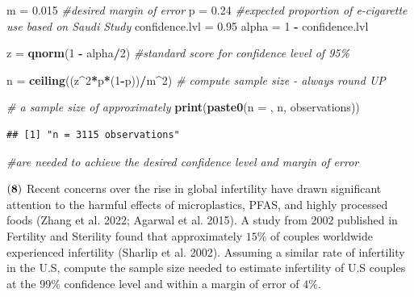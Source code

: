 \documentclass[
]{article}
\newenvironment{Shaded}{\begin{snugshade}}{\end{snugshade}}
\newcommand{\CommentTok}[1]{\textcolor[rgb]{0.56,0.35,0.01}{\textit{#1}}}
\newcommand{\DecValTok}[1]{\textcolor[rgb]{0.00,0.00,0.81}{#1}}
\newcommand{\FloatTok}[1]{\textcolor[rgb]{0.00,0.00,0.81}{#1}}
\newcommand{\FunctionTok}[1]{\textcolor[rgb]{0.13,0.29,0.53}{\textbf{#1}}}
\newcommand{\NormalTok}[1]{#1}
\newcommand{\OtherTok}[1]{\textcolor[rgb]{0.56,0.35,0.01}{#1}}
\newcommand{\SpecialCharTok}[1]{\textcolor[rgb]{0.81,0.36,0.00}{\textbf{#1}}}
\newcommand{\StringTok}[1]{\textcolor[rgb]{0.31,0.60,0.02}{#1}}
\begin{document}
\begin{Shaded}
\begin{Highlighting}[]
\NormalTok{m }\OtherTok{=} \FloatTok{0.015} \CommentTok{\#desired margin of error}
\NormalTok{p }\OtherTok{=} \FloatTok{0.24} \CommentTok{\#expected proportion of e{-}cigarette use based on Saudi Study}
\NormalTok{confidence.lvl }\OtherTok{=} \FloatTok{0.95}
\NormalTok{alpha }\OtherTok{=} \DecValTok{1} \SpecialCharTok{{-}}\NormalTok{ confidence.lvl}

\NormalTok{z }\OtherTok{=} \FunctionTok{qnorm}\NormalTok{(}\DecValTok{1} \SpecialCharTok{{-}}\NormalTok{ alpha}\SpecialCharTok{/}\DecValTok{2}\NormalTok{) }\CommentTok{\#standard score for confidence level of 95\%}

\NormalTok{n }\OtherTok{=} \FunctionTok{ceiling}\NormalTok{((z}\SpecialCharTok{\^{}}\DecValTok{2}\SpecialCharTok{*}\NormalTok{p}\SpecialCharTok{*}\NormalTok{(}\DecValTok{1}\SpecialCharTok{{-}}\NormalTok{p))}\SpecialCharTok{/}\NormalTok{m}\SpecialCharTok{\^{}}\DecValTok{2}\NormalTok{) }\CommentTok{\# compute sample size {-} always round UP}

\CommentTok{\# a sample size of approximately}
\FunctionTok{print}\NormalTok{(}\FunctionTok{paste0}\NormalTok{(}\StringTok{\textquotesingle{}n = \textquotesingle{}}\NormalTok{, n, }\StringTok{\textquotesingle{} observations\textquotesingle{}}\NormalTok{))}
\end{Highlighting}
\end{Shaded}

\begin{verbatim}
## [1] "n = 3115 observations"
\end{verbatim}

\begin{Shaded}
\begin{Highlighting}[]
\CommentTok{\#are needed to achieve the desired confidence level and margin of error}
\end{Highlighting}
\end{Shaded}

\(\bf (8)\) Recent concerns over the rise in global infertility have
drawn significant attention to the harmful effects of microplastics,
PFAS, and highly processed foods (Zhang et al. 2022; Agarwal et al.
2015). A study from 2002 published in Fertility and Sterility found that
approximately \(15\%\) of couples worldwide experienced infertility
(Sharlip et al. 2002). Assuming a similar rate of infertility in the
U.S, compute the sample size needed to estimate infertility of U.S
couples at the \(99\%\) confidence level and within a margin of error of
\(4\%\).
\end{document}
